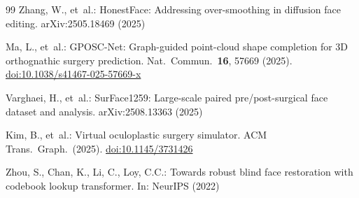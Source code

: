 \documentclass[twocolumn]{article}
\begin{document}
\begin{thebibliography}{99}
Zhang, W., et~al.:
HonestFace: Addressing over-smoothing in diffusion face editing.
arXiv:2505.18469 (2025)

Ma, L., et~al.:
GPOSC-Net: Graph-guided point-cloud shape completion for 3D orthognathic
surgery prediction.
Nat.\ Commun.\ \textbf{16}, 57669 (2025).
\href{https://doi.org/10.1038/s41467-025-57669-x}{doi:10.1038/s41467-025-57669-x}

Varghaei, H., et~al.:
SurFace1259: Large-scale paired pre/post-surgical face dataset and
analysis.
arXiv:2508.13363 (2025)

Kim, B., et~al.:
Virtual oculoplastic surgery simulator.
ACM Trans.\ Graph.\ (2025).
\href{https://doi.org/10.1145/3731426}{doi:10.1145/3731426}

Zhou, S., Chan, K., Li, C., Loy, C.C.:
Towards robust blind face restoration with codebook lookup transformer.
In: NeurIPS (2022)

\end{thebibliography}
\end{document}
